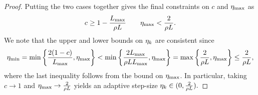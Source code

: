 \begin{proof}
    Putting the two cases together gives the final constraints on \( c \) and \( \eta_{\text{max}} \) as
    \[ c \geq 1 - \frac{L_{\text{max}}}{\rho L} \quad \quad \eta_{\text{max}} < \frac{2}{\rho L}. \]
    We note that the upper and lower bounds on \( \eta_k \) are consistent since 
    \[ \eta_{\text{min}} = \min\left\{\frac{2(1-c)}{L_{\text{max}}}, \eta_{\text{max}}\right\} < \min\left\{\frac{2 L_{\text{max}}}{\rho L L_{\text{max}}}, \eta_{\text{max}}\right\} = \max\left\{\frac{2}{\rho L}, \eta_{\text{max}}\right\} \leq \frac{2}{\rho L}, \] 
    where the last inequality follows from the bound on \( \eta_{\text{max}} \).
    In particular, taking \( c \rightarrow 1 \) and \( \eta_{\text{max}} \rightarrow \frac{2}{\rho L} \) yields an adaptive step-size \(\eta_k \in (0,\frac{2}{\rho L}).  \)
\end{proof}


